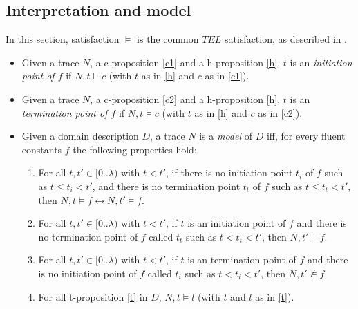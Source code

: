 \subsection{Interpretation and model}

In this section, satisfaction $\vDash$ is the common $TEL$ satisfaction, as described in \cite{cakascsc18a}.

\begin{itemize}
  \item Given a trace $N$, a c-proposition \ref{c1} and a h-proposition \ref{h}, $t$ is an \emph{initiation point of $f$} if $N,t \vDash c$ (with $t$ as in \ref{h} and $c$ as in \ref{c1}).
  \item Given a trace $N$, a c-proposition \ref{c2} and a h-proposition \ref{h}, $t$ is an \emph{termination point of $f$} if $N,t \vDash c$ (with $t$ as in \ref{h} and $c$ as in \ref{c2}).
  \item Given a domain description $D$, a trace $N$ is a \emph{model} of $D$ iff, for every fluent constants $f$ the following properties hold:
  \begin{enumerate}
    \item For all $t,t'\in [0..\lambda)$ with $t<t'$, if there is no initiation point $t_i$ of $f$ such as $t \leq t_i < t'$, and there is no termination point $t_t$ of $f$ such as $t \leq t_t < t'$, then $N,t \vDash f \leftrightarrow N,t' \vDash f$.
    \item For all $t,t'\in [0..\lambda)$ with $t<t'$, if $t$ is an initiation point of $f$ and there is no termination point of $f$ called $t_t$ such as $t < t_t < t'$, then $N,t' \vDash f$.
    \item For all $t,t'\in [0..\lambda)$ with $t<t'$, if $t$ is an termination point of $f$ and there is no initiation point of $f$ called $t_i$ such as $t < t_i < t'$, then $N,t' \nvDash f$.
    \item For all t-proposition \ref{t} in $D$, $N,t \vDash l$ (with $t$ and $l$ as in \ref{t}).
  \end{enumerate}
\end{itemize}

